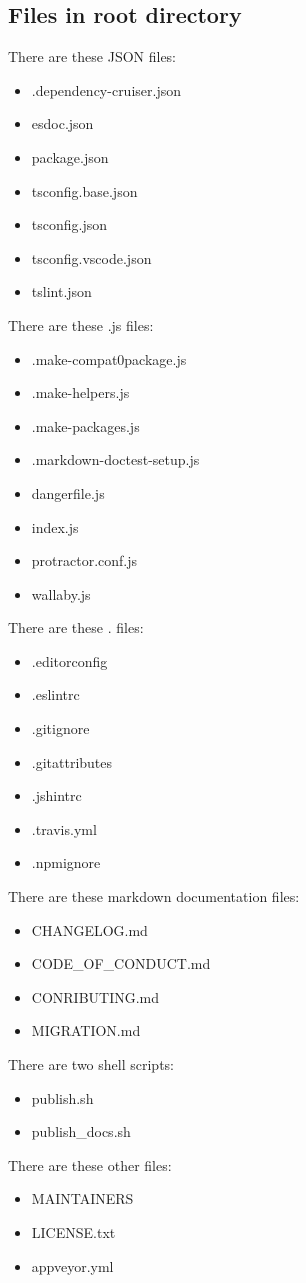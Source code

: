 \subsection{Files in root directory}

There are these JSON files:

\begin{itemize}
  \item .dependency-cruiser.json
  \item esdoc.json
  \item package.json
  \item tsconfig.base.json
  \item tsconfig.json
  \item tsconfig.vscode.json
  \item tslint.json
\end{itemize}

There are these .js files:

\begin{itemize}
  \item .make-compat0package.js
  \item .make-helpers.js
  \item .make-packages.js
  \item .markdown-doctest-setup.js
  \item dangerfile.js
  \item index.js
  \item protractor.conf.js
  \item wallaby.js
\end{itemize}

There are these . files:

\begin{itemize}
  \item .editorconfig
  \item .eslintrc
  \item .gitignore
  \item .gitattributes
  \item .jshintrc
  \item .travis.yml
  \item .npmignore
\end{itemize}

There are these markdown documentation files:

\begin{itemize}
  \item CHANGELOG.md
  \item CODE\_OF\_CONDUCT.md
  \item CONRIBUTING.md
  \item MIGRATION.md
\end{itemize}

There are two shell scripts:

\begin{itemize}
  \item publish.sh
  \item publish\_docs.sh
\end{itemize}

There are these other files:

\begin{itemize}
  \item MAINTAINERS
  \item LICENSE.txt
  \item appveyor.yml
\end{itemize}
